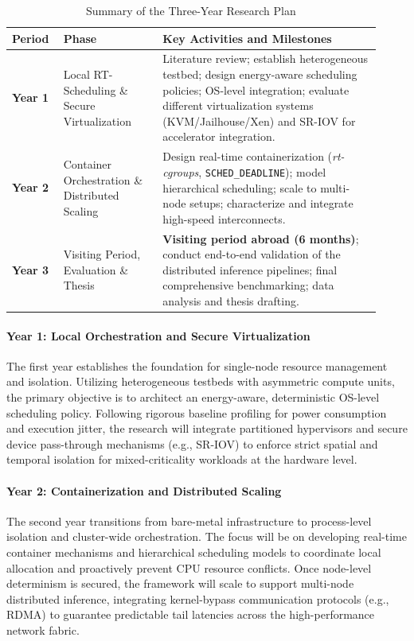 \documentclass[11pt,a4paper]{article}
\begin{document}
\begin{table}[htbp]
    \centering
    \renewcommand{\arraystretch}{1.4}
    \begin{tabular}{| p{0.12\linewidth} | p{0.25\linewidth} | p{0.55\linewidth} |}
        \hline
        \textbf{Period} & \textbf{Phase} & \textbf{Key Activities and Milestones} \\
        \hline \hline

        \textbf{Year 1} & Local RT-Scheduling \& Secure Virtualization &
        Literature review; establish heterogeneous testbed; design energy-aware scheduling policies; OS-level integration; evaluate different virtualization systems (KVM/Jailhouse/Xen) and SR-IOV for accelerator integration. \\
        \hline

        \textbf{Year 2} & Container Orchestration \& Distributed Scaling &
        Design real-time containerization (\textit{rt-cgroups}, \texttt{SCHED\_DEADLINE}); model hierarchical scheduling; scale to multi-node setups; characterize and integrate high-speed interconnects. \\
        \hline

        \textbf{Year 3} & Visiting Period, Evaluation \& Thesis &
        \textbf{Visiting period abroad (6 months)}; conduct end-to-end validation of the distributed inference pipelines; final comprehensive benchmarking; data analysis and thesis drafting. \\
        \hline
    \end{tabular}
    \caption{Summary of the Three-Year Research Plan}
    \label{tab:timeline}
\end{table}

\paragraph{Year 1: Local Orchestration and Secure Virtualization}
The first year establishes the foundation for single-node resource management and isolation. Utilizing heterogeneous testbeds with asymmetric compute units, the primary objective is to architect an energy-aware, deterministic OS-level scheduling policy. Following rigorous baseline profiling for power consumption and execution jitter, the research will integrate partitioned hypervisors and secure device pass-through mechanisms (e.g., SR-IOV) to enforce strict spatial and temporal isolation for mixed-criticality workloads at the hardware level.

\paragraph{Year 2: Containerization and Distributed Scaling}
The second year transitions from bare-metal infrastructure to process-level isolation and cluster-wide orchestration. The focus will be on developing real-time container mechanisms and hierarchical scheduling models to coordinate local allocation and proactively prevent CPU resource conflicts. Once node-level determinism is secured, the framework will scale to support multi-node distributed inference, integrating kernel-bypass communication protocols (e.g., RDMA) to guarantee predictable tail latencies across the high-performance network fabric.
\end{document}
